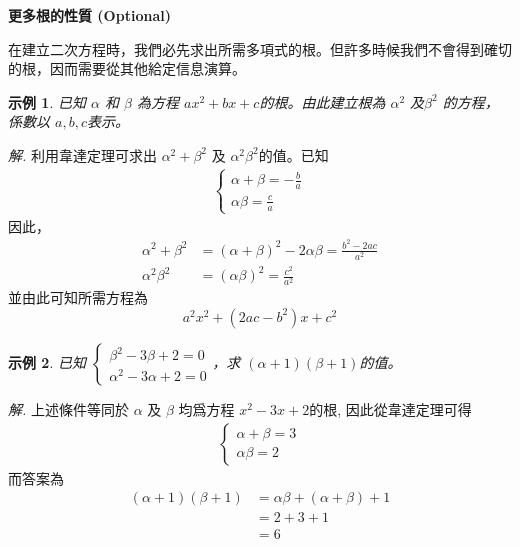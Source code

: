 \documentclass[12pt]{article}
\newtheorem{example}{示例}
\begin{document}
    \begin{center}
        \textbf{更多根的性質 (Optional)}
    \end{center}

    在建立二次方程時，我們必先求出所需多項式的根。但許多時候我們不會得到確切的根，因而需要從其他給定信息演算。

    \begin{example}
        已知 $\alpha$ 和 $\beta$ 為方程 $ax^2+bx+c$的根。由此建立根為 $\alpha^2$ 及$\beta^2$ 的方程，係數以 $a,b,c$表示。
    \end{example}

    \textit{ 解.} 利用韋達定理可求出 $\alpha^2+\beta^2$ 及 $\alpha^2\beta^2$的值。已知 \begin{align*}
        \begin{cases}
            \alpha+\beta=-\frac{b}{a}\\
            \alpha\beta=\frac{c}{a}
        \end{cases}
    \end{align*}
    因此， \begin{align*}
        \alpha^2+\beta^2&=(\alpha+\beta)^2-2\alpha\beta=\frac{b^2-2ac}{a^2}\\
        \alpha^2\beta^2&=(\alpha\beta)^2=\frac{c^2}{a^2}
    \end{align*}
    並由此可知所需方程為 $$a^2x^2+(2ac-b^2)x+c^2$$

    \begin{example}
        已知 $\begin{cases}
                \beta^2-3\beta+2=0\\
                \alpha^2-3\alpha+2=0
            \end{cases}$，求 $(\alpha+1)(\beta+1)$的值。
    \end{example}

    \textit{ 解.} 上述條件等同於 $\alpha$ 及 $\beta$ 均爲方程 $x^2-3x+2$的根, 因此從韋達定理可得 \begin{align*}
        \begin{cases}
            \alpha+\beta=3\\
            \alpha\beta=2
        \end{cases}
    \end{align*}
    而答案為\begin{align*}
        (\alpha+1)(\beta+1)&=\alpha\beta+(\alpha+\beta)+1\\
        &=2+3+1\\
        &=6
    \end{align*}
\end{document}
